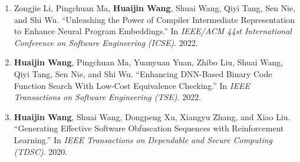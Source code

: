 \begin{enumerate}
    \item Zongjie Li, Pingchuan Ma, \textbf{Huaijin Wang}, Shuai Wang, Qiyi Tang, Sen Nie, and Shi Wu.
    ``Unleashing the Power of Compiler
    Intermediate Representation to Enhance Neural Program Embeddings.''
    In \textit{IEEE/ACM 44st International Conference on Software Engineering (ICSE)}. 2022.
    
    \item \textbf{Huaijin Wang}, Pingchuan Ma, Yuanyuan Yuan, Zhibo Liu, Shuai Wang, Qiyi Tang, Sen Nie, and Shi Wu.
    ``Enhancing DNN-Based
    Binary Code Function Search With Low-Cost Equivalence Checking.''
    In \textit{IEEE Transactions on Software Engineering (TSE)}. 2022.
    
    
    \item \textbf{Huaijin Wang}, Shuai Wang, Dongpeng Xu, Xiangyu Zhang, and Xiao Liu.
    ``Generating Effective Software Obfuscation Sequences with Reinforcement Learning.''
    In \textit{IEEE Transactions on Dependable and Secure Computing (TDSC)}. 2020.
    
\end{enumerate}
